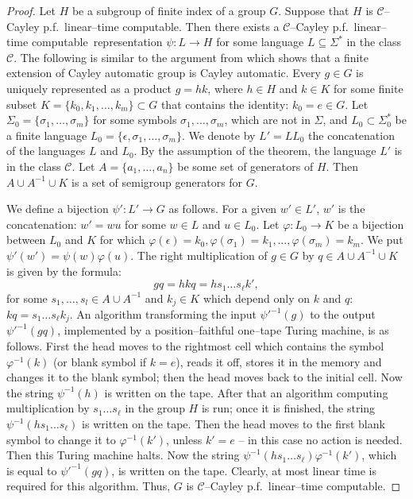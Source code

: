 \documentclass[article,12pt]{elsarticle}
\newcommand\ClinearC{$\mathcal{C}$--Cayley p.f.~linear--time computable}
\begin{document}
\begin{proof} 
	Let $H$ be a subgroup of finite index of 
	a group $G$. Suppose that $H$ is 
	\ClinearC.    
	Then there exists a 
	\ClinearC\ 
	representation $\psi : L \rightarrow H$ for some 
	language $L \subseteq \Sigma^*$ 
	in the class $\mathcal{C}$.    
	The following is similar to the argument  
	from \cite[Theorem~10.1]{KKM11} 
	which shows that a finite extension 
	of Cayley automatic group is Cayley automatic.  
	Every $g \in G$ is uniquely represented 
	as a product $g = h k$, where $h \in H$ and 
	$k \in K$ for some finite subset 
	$K = \{ k_0, k_1, \dots, k_m\}\subset G$ 
	that contains the identity: $k_0 = e \in G$.
	Let $\Sigma_0 = \{\sigma_1, \dots,\sigma_m\}$ for
	some symbols $\sigma_1, \dots,\sigma_m$, 
	which are not in $\Sigma$, and 
	$L_0 \subset \Sigma_0 ^*$ be a finite 
	language $L_0 = \{\epsilon,\sigma_1, \dots,\sigma_m\}$.
	We denote by $L'=LL_0$ the concatenation of 
	the languages $L$ and $L_0$. 
	By the assumption of the theorem, 
	the language $L'$ is in the class $\mathcal{C}$.
	Let $A = \{a_1,\dots, a_n\}$ be some set of 
	generators of $H$. Then $A \cup A^{-1} \cup K$ is 
	a set of semigroup generators for $G$.    
	
	We define a bijection $\psi' : L' \rightarrow G$ 
	as follows. For a given $w' \in L'$, 
	$w'$ is the concatenation:  
	$w' = w u$ for some $w \in L$ and $u \in L_0$.     
	Let $\varphi : L_0 \rightarrow K$ be a bijection 
	between $L_0$ and $K$ for which 
	$\varphi(\epsilon) = k_0, \varphi(\sigma_1)=k_1, \dots, 
	\varphi(\sigma_m) = k_m$. 
	We put $\psi' (w') = \psi(w) \varphi(u)$. 
	The right multiplication of $g \in G$ by 
	$q \in A \cup A^{-1} \cup K$ 
	is given by the formula:
	$$ g q = hkq = h s_1 \dots s_\ell k', $$   
	for some $s_1, \dots, s_l \in A \cup A^{-1}$ and 
	$k_j \in K$ which depend only on 
	$k$ and $q$: $kq = s_1 \dots s_\ell k_j$. 
	An algorithm transforming the input 
	$\psi'^{-1}(g)$ to the output 
	$\psi'^{-1}(gq)$, implemented by 
	a position--faithful 
	one--tape Turing machine, is as follows. 
	First the head moves to the rightmost cell which 
	contains the symbol $\varphi^{-1}(k)$ 
	(or blank symbol if $k=e$), reads it off, stores it 
	in the memory and changes it to the blank symbol; 
	then the head moves back to the initial cell. 
	Now the string 
	$\psi^{-1}(h)$ is written on the tape.  
	After that an algorithm computing   
	multiplication by $s_1\dots s_\ell$  in the group 
	$H$ is run; once it is finished, the string 
	$\psi^{-1}(hs_1 \dots  s_\ell)$ is written on the tape.    
	Then the head moves to the first blank symbol 
	to change it to $\varphi^{-1}(k')$, unless $k'=e$ -- 
	in this case no action is needed. Then this Turing 
	machine halts. Now the string 
	$\psi^{-1}(hs_1\dots s_\ell)\varphi^{-1}(k')$, 
	which is equal to $\psi'^{-1}(gq)$,   
	is written on the tape.
	Clearly, at most linear time is required for this
	algorithm. Thus, $G$ is 
	\ClinearC. 
\end{proof} 
\end{document}
